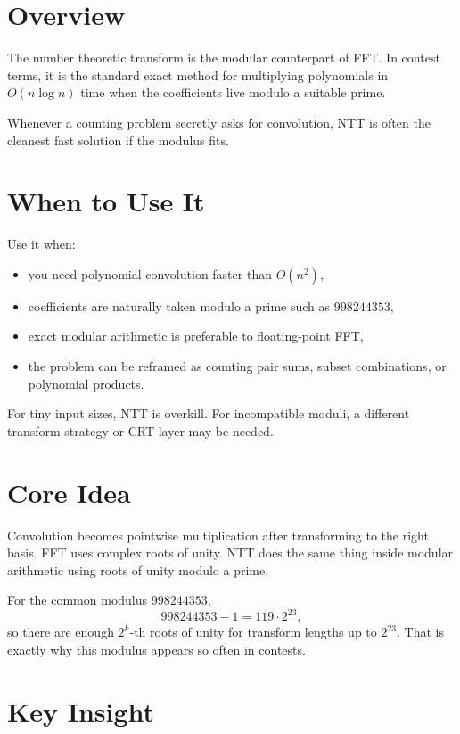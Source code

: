 \section*{Overview}

The number theoretic transform is the modular counterpart of FFT. In contest terms, it is the standard exact method
for multiplying polynomials in \(O(n \log n)\) time when the coefficients live modulo a suitable prime.

Whenever a counting problem secretly asks for convolution, NTT is often the cleanest fast solution if the modulus fits.

\section*{When to Use It}

Use it when:

\begin{itemize}
  \item you need polynomial convolution faster than \(O(n^2)\),
  \item coefficients are naturally taken modulo a prime such as \(998244353\),
  \item exact modular arithmetic is preferable to floating-point FFT,
  \item the problem can be reframed as counting pair sums, subset combinations, or polynomial products.
\end{itemize}

For tiny input sizes, NTT is overkill. For incompatible moduli, a different transform strategy or CRT layer may be
needed.

\section*{Core Idea}

Convolution becomes pointwise multiplication after transforming to the right basis. FFT uses complex roots of unity.
NTT does the same thing inside modular arithmetic using roots of unity modulo a prime.

For the common modulus \(998244353\),
\[
998244353 - 1 = 119 \cdot 2^{23},
\]
so there are enough \(2^k\)-th roots of unity for transform lengths up to \(2^{23}\). That is exactly why this modulus
appears so often in contests.

\section*{Key Insight}

